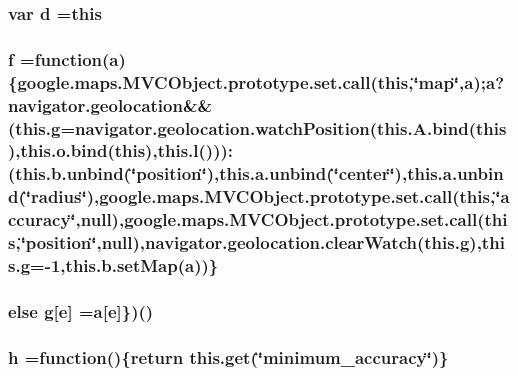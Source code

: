 \subsubsection[{\texorpdfstring{d}{d}}]{\setlength{\rightskip}{0pt plus 5cm}var d =this}\hypertarget{geolocation-marker_8js_aeb337d295abaddb5ec3cb34cc2e2bbc9}{}\label{geolocation-marker_8js_aeb337d295abaddb5ec3cb34cc2e2bbc9}
\subsubsection[{\texorpdfstring{f}{f}}]{ f =function({\bf a})\{google.\+maps.\+M\+V\+C\+Object.\+prototype.\+set.\+call(this,\char`\"{}map\char`\"{},a);{\bf a}?navigator.\+geolocation\&\&({\bf this.\+g}=navigator.\+geolocation.\+watch\+Position({\bf this.\+A.\+bind}(this),{\bf this.\+o.\+bind}(this),{\bf this.\+l}()))\+:({\bf this.\+b.\+unbind}(\char`\"{}position\char`\"{}),this.\+a.\+unbind(\char`\"{}center\char`\"{}),this.\+a.\+unbind(\char`\"{}radius\char`\"{}),google.\+maps.\+M\+V\+C\+Object.\+prototype.\+set.\+call(this,\char`\"{}accuracy\char`\"{},null),google.\+maps.\+M\+V\+C\+Object.\+prototype.\+set.\+call(this,\char`\"{}position\char`\"{},null),navigator.\+geolocation.\+clear\+Watch({\bf this.\+g}),{\bf this.\+g}=-\/1,this.\+b.\+set\+Map({\bf a}))\}}\hypertarget{geolocation-marker_8js_adac433431acf4016698bcb73fcf42d0b}{}\label{geolocation-marker_8js_adac433431acf4016698bcb73fcf42d0b}
\subsubsection[{\texorpdfstring{g}{g}}]{\setlength{\rightskip}{0pt plus 5cm}else g\mbox{[}{\bf e}\mbox{]} ={\bf a}\mbox{[}{\bf e}\mbox{]}\})()}\hypertarget{geolocation-marker_8js_a8ffc8891d5b829380098642c32da1985}{}\label{geolocation-marker_8js_a8ffc8891d5b829380098642c32da1985}
\subsubsection[{\texorpdfstring{h}{h}}]{ h =function()\{return {\bf this.\+get}(\char`\"{}minimum\+\_\+accuracy\char`\"{})\}}\hypertarget{geolocation-marker_8js_a7d9295d5021b819dbc38a41df84a0491}{}\label{geolocation-marker_8js_a7d9295d5021b819dbc38a41df84a0491}
